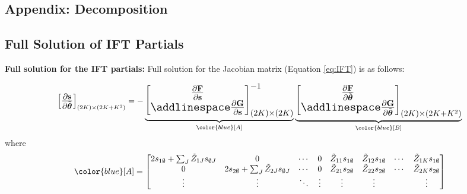 
\begin{landscape}
\section{Appendix: Decomposition} \label{appsec:decomp}

\subsection{Full Solution of IFT Partials}  \label{appsec:decomp-method}

\textbf{Full solution for the IFT partials:} Full solution for the Jacobian matrix (Equation \ref{eq:IFT}) is as follows:

\begin{align*}
\begin{Large}
	\begin{bmatrix}
		 \frac{\partial \mathbf{s} }{\partial \tilde{\boldsymbol{\theta}}}
	\end{bmatrix}_{(2K) \times (2K+K^2)}
	= - 
	\underbrace{\begin{bmatrix}
		\frac{\partial \mathbf{F}}{\partial  \mathbf{s} } \\ \addlinespace 
		\frac{\partial \mathbf{G}}{\partial  \mathbf{s} } 
	\end{bmatrix}^{-1}_{(2K)\times (2K)}}_{\color{blue} [A]}
	\underbrace{\begin{bmatrix}
		\frac{\partial \mathbf{F}}{\partial \tilde{\boldsymbol{\theta}} } \\ \addlinespace 
		\frac{\partial \mathbf{G}}{\partial \tilde{\boldsymbol{\theta}}}
	\end{bmatrix}_{(2K) \times (2K+K^2)}}_{\color{blue} [B]}
	\end{Large} 
\end{align*}
where 
\begin{align*}
	{\color{blue} [A]} = 
	\begin{bmatrix}
	2s_{1\emptyset} + \sum_J \tilde{Z}_{1J}s_{\emptyset J} & 0 & \cdots & 0 & \tilde{Z}_{11}s_{1\emptyset} & \tilde{Z}_{12}s_{1\emptyset} & \cdots & \tilde{Z}_{1K}s_{1\emptyset} \\
	0 & 2s_{2\emptyset} + \sum_J \tilde{Z}_{2J}s_{\emptyset J} & \cdots & 0 & \tilde{Z}_{21}s_{2\emptyset} & \tilde{Z}_{22}s_{2\emptyset} & \cdots & \tilde{Z}_{2K}s_{2\emptyset} \\
	\vdots & \vdots & \ddots & \vdots &  \vdots & \vdots &  & \vdots \\

\end{bmatrix}
\end{align*}
\end{landscape}
